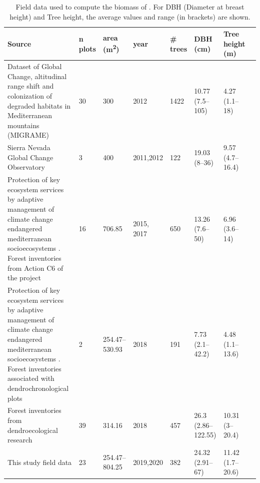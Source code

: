 \begin{table} 
\caption{Field data used to compute the biomass of \Qp. For DBH (Diameter at breast height) and Tree height, the average values and range (in brackets) are shown.}\label{tab:carbon:inventories}
\begin{adjustbox}{width=\linewidth}
	\begin{threeparttable}
		\begin{tabular}{p{10cm}lllllll}
		\toprule[0.5pt]
		\textbf{Source} & \textbf{n plots} & \textbf{area (m\textsuperscript{2})} & \textbf{year} & \textbf{\# trees} & \textbf{DBH (cm)} & \textbf{Tree height (m)} \\ \toprule 
		Dataset of Global Change, altitudinal range shift and colonization of degraded habitats in Mediterranean mountains (MIGRAME) \autocite{PerezLuqueetal2015DatasetMIGRAME} & 30 & 300 & 2012 & 1422 & 10.77 (7.5--105) & 4.27 (1.1--18) \\ \midrule
		Sierra Nevada Global Change Observatory \autocites{Aspizuaetal2014EvaluacionGestion,Zamoraetal2017GlobalChange} & 3 & 400 & 2011,2012 & 122 & 19.03 (8--36) & 9.57 (4.7--16.4) \\ \midrule
		Protection of key ecosystem services by adaptive management of climate change endangered mediterranean socioecosystems \autocite{BareaAzconetal2017LIFEADAPTAMED}. Forest inventories from Action C6 of the project & 16 & 706.85 & 2015, 2017 & 650 & 13.26 (7.6--50) & 6.96 (3.6--14) \\ \midrule
		Protection of key ecosystem services by adaptive management of climate change endangered mediterranean socioecosystems \autocite{BareaAzconetal2017LIFEADAPTAMED}. Forest inventories associated with dendrochronological plots & 2 & 254.47--530.93 & 2018 & 191 & 7.73 (2.1--42.2) & 4.48 (1.1--13.6) \\ \midrule
		Forest inventories from dendroecological research \autocite[see chapter \ref{sec:dendro};][]{PerezLuqueetal2020LanduseLegacies} & 39 & 314.16 & 2018 & 457 & 26.3 (2.86--122.55) & 10.31 (3--20.4) \\ \midrule
		This study field data & 23 & 254.47--804.25 & 2019,2020 & 382 & 24.32 (2.91--67) & 11.42 (1.7--20.6) \\ \bottomrule
		\end{tabular}
	\end{threeparttable}
\end{adjustbox}
\end{table}

